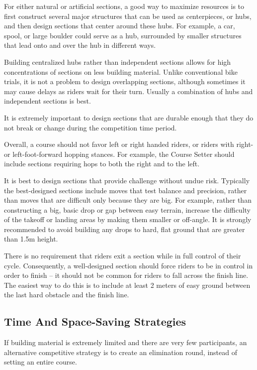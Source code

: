 For either natural or artificial sections, a good way to maximize resources is to first construct several major structures that can be used as centerpieces, or hubs, and then design sections that center around these hubs.
For example, a car, spool, or large boulder could serve as a hub, surrounded by smaller structures that lead onto and over the hub in different ways.

Building centralized hubs rather than independent sections allows for high concentrations of sections on less building material.
Unlike conventional bike trials, it is not a problem to design overlapping sections, although sometimes it may cause delays as riders wait for their turn.
Usually a combination of hubs and independent sections is best.

It is extremely important to design sections that are durable enough that they do not break or change during the competition time period.

Overall, a course should not favor left or right handed riders, or riders with right- or left-foot-forward hopping stances.
For example, the Course Setter should include sections requiring hops to both the right and to the left.

It is best to design sections that provide challenge without undue risk.
Typically the best-designed sections include moves that test balance and precision, rather than moves that are difficult only because they are big.
For example, rather than constructing a big, basic drop or gap between easy terrain, increase the difficulty of the takeoff or landing areas by making them smaller or off-angle.
It is strongly recommended to avoid building any drops to hard, flat ground that are greater than 1.5m height.

There is no requirement that riders exit a section while in full control of their cycle.
Consequently, a well-designed section should force riders to be in control in order to finish -- it should not be common for riders to fall across the finish line.
The easiest way to do this is to include at least 2 meters of easy ground between the last hard obstacle and the finish line.

\subsection{Time And Space-Saving Strategies}
If building material is extremely limited and there are very few participants, an alternative competitive strategy is to create an elimination round, instead of setting an entire course.


